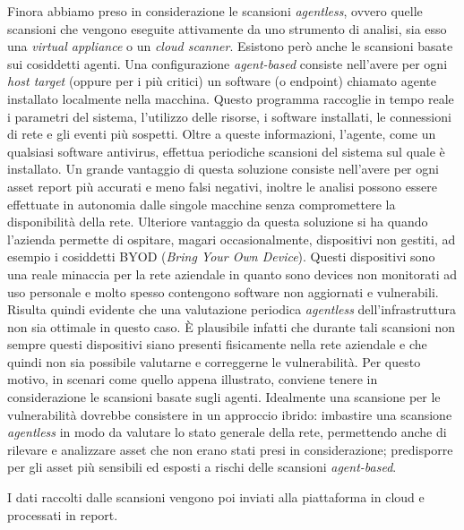 \documentclass[target=mst,aauheader=]{thud}
\begin{document}
Finora abbiamo preso in considerazione le scansioni \textit{agentless}, ovvero quelle scansioni che vengono eseguite attivamente da uno strumento di analisi, sia esso una \textit{virtual appliance} o un \textit{cloud scanner}. Esistono però anche le scansioni basate sui cosiddetti agenti. Una configurazione \textit{agent-based} consiste nell’avere per ogni \textit{host target} (oppure per i più critici) un software (o endpoint) chiamato agente installato localmente nella macchina. Questo programma raccoglie in tempo reale i parametri del sistema, l’utilizzo delle risorse, i software installati, le connessioni di rete e gli eventi più sospetti. Oltre a queste informazioni, l’agente, come un qualsiasi software antivirus, effettua periodiche scansioni del sistema sul quale è installato. Un grande vantaggio di questa soluzione consiste nell’avere per ogni asset report più accurati e meno falsi negativi, inoltre le analisi possono essere effettuate in autonomia dalle singole macchine senza compromettere la disponibilità della rete. Ulteriore vantaggio da questa soluzione si ha quando l’azienda permette di ospitare, magari occasionalmente, dispositivi non gestiti, ad esempio i cosiddetti BYOD (\textit{Bring Your Own Device}). Questi dispositivi sono una reale minaccia per la rete aziendale in quanto sono devices non monitorati ad uso personale e molto spesso contengono software non aggiornati e vulnerabili. Risulta quindi evidente che una valutazione periodica \textit{agentless} dell’infrastruttura non sia ottimale in questo caso. È plausibile infatti che durante tali scansioni non sempre questi dispositivi siano presenti fisicamente nella rete aziendale e che quindi non sia possibile valutarne e correggerne le vulnerabilità. Per questo motivo, in scenari come quello appena illustrato, conviene tenere in considerazione le scansioni basate sugli agenti. Idealmente una scansione per le vulnerabilità dovrebbe consistere in un approccio ibrido: imbastire una scansione \textit{agentless} in modo da valutare lo stato generale della rete, permettendo anche di rilevare e analizzare asset che non erano stati presi in considerazione; predisporre per gli asset più sensibili ed esposti a rischi delle scansioni \textit{agent-based}.

I dati raccolti dalle scansioni vengono poi inviati alla piattaforma in cloud e processati in report.
\end{document}
